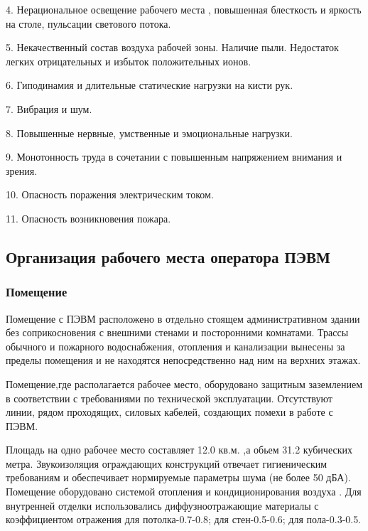 \begin{par}
	4. Нерациональное освещение рабочего места , повышенная блесткость и яркость на столе,
		пульсации светового потока.
\end{par}

\begin{par}
	5. Некачественный состав воздуха рабочей зоны. Наличие пыли. Недостаток
		легких отрицательных и избыток положительных ионов.
\end{par}
\begin{par}
 	6. Гиподинамия и длительные статические нагрузки на кисти рук.
\end{par}

\begin{par}
	7. Вибрация и шум.
\end{par}

\begin{par}
	8. Повышенные нервные, умственные и эмоциональные нагрузки.
\end{par}

\begin{par}
	9. Монотонность труда в сочетании с повышенным напряжением внимания и зрения.
\end{par}
\begin{par}
	10. Опасность поражения электрическим током.
\end{par}
\begin{par}
 	11. Опасность возникновения пожара.
\end{par}

\subsection{Организация рабочего места оператора ПЭВМ}
\subsubsection{Помещение}
Помещение с ПЭВМ расположено в отдельно стоящем административном здании без соприкосновения
с внешними стенами и посторонними комнатами. Трассы обычного и пожарного водоснабжения,
отопления и канализации вынесены за пределы помещения  и не находятся непосредственно над ним
на верхних этажах.


Помещение,где располагается рабочее место, оборудовано защитным заземлением в соответствии
с требованиями по технической эксплуатации. Отсутствуют линии, рядом проходящих, силовых
кабелей, создающих помехи в работе с ПЭВМ.


Площадь на одно рабочее место  составляет  12.0 кв.м. ,а обьем 31.2 кубических метра.
Звукоизоляция ограждающих конструкций отвечает гигиеническим требованиям и обеспечивает
нормируемые параметры шума (не более 50 дБА). Помещение оборудовано системой отопления и
кондиционирования воздуха . Для внутренней отделки использовались диффузноотражающие
материалы с коэффициентом отражения для потолка-0.7-0.8; для стен-0.5-0.6; для пола-0.3-0.5.


